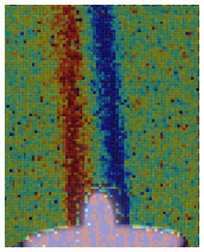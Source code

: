 \documentclass[letterpaper,12pt]{article}
\begin{document}
\begin{figure}[h]
    \centering
    \begin{subfigure}[b]{0.3\textwidth}
    	\centering
        \includegraphics[width=0.95\textwidth]{Plot_X_Displacement.PNG}
        \caption{}
        \label{fig:Plot_X_Displacement}
    \end{subfigure}
    \begin{subfigure}[b]{0.3\textwidth}
    	\centering

\end{subfigure}
\end{figure}
\end{document}
